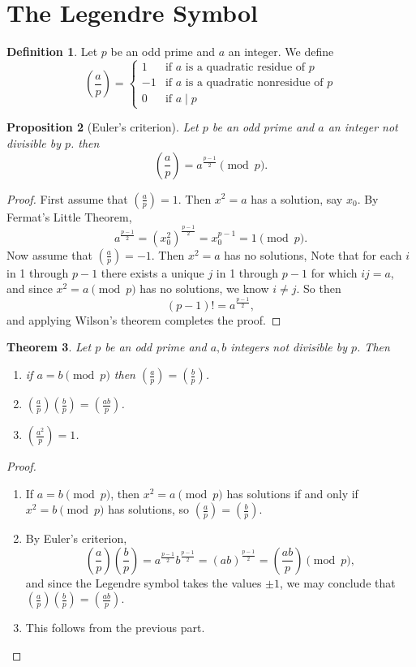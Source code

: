 \documentclass{amsbook}
\numberwithin{section}{chapter}
\theoremstyle{plain}
\newtheorem{thm}{Theorem}[section]
\newtheorem{prop}[thm]{Proposition}
\theoremstyle{definition}
\newtheorem{defn}[thm]{Definition}
\begin{document}
\section{The Legendre Symbol}
\begin{defn}
Let $p$ be an odd prime and $a$ an integer. We define
\[\left(\frac{a}{p}\right) = \begin{cases}
1 &\text{if $a$ is a quadratic residue of $p$}\\
-1 &\text{if $a$ is a quadratic nonresidue of $p$}\\
0 &\text{if $a\mid p$}
\end{cases}\]
\end{defn}
\begin{prop}[Euler's criterion]
Let $p$ be an odd prime and $a$ an integer not divisible by $p$.
then
\[\left(\frac{a}{p}\right) = a^\frac{p-1}{2}\pmod p.\]
\end{prop}
\begin{proof}
First assume that 
$\left(\frac{a}{p}\right) = 1$. Then $x^2 = a$ has a solution,
say $x_0$. By Fermat's Little Theorem,
\[a^\frac{p-1}{2} = (x_0^2)^\frac{p-1}{2} = x_0^{p-1} = 1\pmod p.\]
Now assume that 
$\left(\frac{a}{p}\right) = -1$. Then $x^2 = a$ has no solutions,
Note that for each $i$ in 1 through $p-1$ there exists a unique $j$
in 1 through $p-1$ for which $ij = a$, and since $x^2 = a\pmod p$ has
no solutions, we know $i\ne j$. So then
\[(p-1)! = a^\frac{p-1}{2},\]
and applying Wilson's theorem completes the proof.
\end{proof}
\begin{thm}
Let $p$ be an odd prime and $a, b$ integers not divisible by $p$.
Then
\begin{enumerate}
\item if $a = b\pmod p$ then
$\left(\frac{a}{p}\right) = \left(\frac{b}{p}\right)$.
\item 
$\left(\frac{a}{p}\right)\left(\frac{b}{p}\right) = 
\left(\frac{ab}{p}\right)$.
\item
$\left(\frac{a^2}{p}\right) = 1$.
\end{enumerate}
\end{thm}
\begin{proof}
\begin{enumerate}
\item If $a = b\pmod p$, then $x^2 = a\pmod p$
has solutions if and only if $x^2 = b\pmod p$
has solutions, so
$\left(\frac{a}{p}\right) = \left(\frac{b}{p}\right)$.
\item By Euler's criterion,
\[\left(\frac{a}{p}\right)\left(\frac{b}{p}\right) =
a^\frac{p-1}{2}b^\frac{p-1}{2} = (ab)^\frac{p-1}{2} = 
\left(\frac{ab}{p}\right)\pmod p,\]
and since the Legendre symbol takes the values $\pm 1$,
we may conclude that
$\left(\frac{a}{p}\right)\left(\frac{b}{p}\right) = 
\left(\frac{ab}{p}\right)$.
\item This follows from the previous part.
\end{enumerate}
\end{proof}
\end{document}
